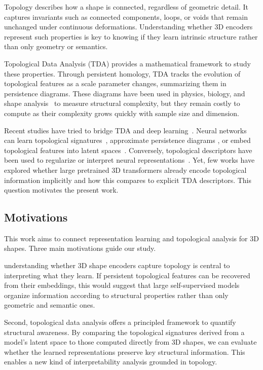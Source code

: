 Topology describes how a shape is connected, regardless of geometric detail. It captures invariants such as connected components, loops, or voids that remain unchanged under continuous deformations. Understanding whether 3D encoders represent such properties is key to knowing if they learn intrinsic structure rather than only geometry or semantics.

Topological Data Analysis (TDA) provides a mathematical framework to study these properties. Through persistent homology, TDA tracks the evolution of topological features as a scale parameter changes, summarizing them in persistence diagrams. These diagrams have been used in physics, biology, and shape analysis~\cite{top_signatures} to measure structural complexity, but they remain costly to compute as their complexity grows quickly with sample size and dimension.

Recent studies have tried to bridge TDA and deep learning~\cite{optimizing_persistent_homology, persistent_homology_seg, }. Neural networks can learn topological signatures~\cite{atol}, approximate persistence diagrams \cite{neural_approximation_graph_topological_features}, or embed topological features into latent spaces~\cite{topological_autoencoders}. Conversely, topological descriptors have been used to regularize or interpret neural representations~\cite{top_layer, topology_activations, top_reg}. Yet, few works have explored whether large pretrained 3D transformers already encode topological information implicitly and how this compares to explicit TDA descriptors. This question motivates the present work.

\subsection{Motivations}

This work aims to connect representation learning and topological analysis for 3D shapes. Three main motivations guide our study.

understanding whether 3D shape encoders capture topology is central to interpreting what they learn. If persistent topological features can be recovered from their embeddings, this would suggest that large self-supervised models organize information according to structural properties rather than only geometric and semantic ones.

Second, topological data analysis offers a principled framework to quantify structural awareness. By comparing the topological signatures derived from a model’s latent space to those computed directly from 3D shapes, we can evaluate whether the learned representations preserve key structural information. This enables a new kind of interpretability analysis grounded in topology.

